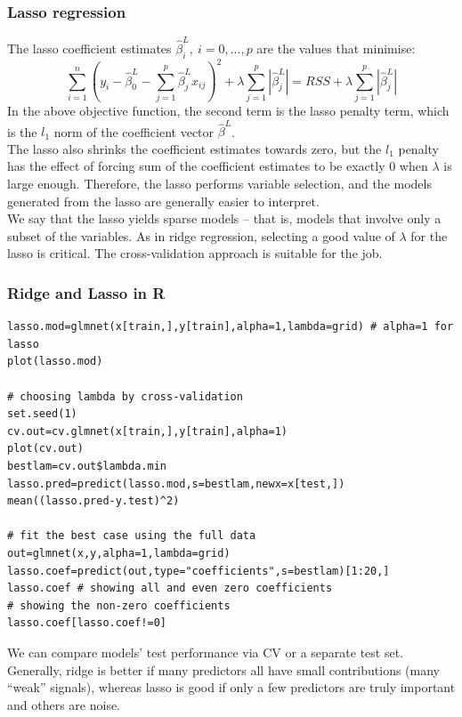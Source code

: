 \documentclass[11pt]{article}
\begin{document}
\subsubsection{Lasso regression}
\noindent The lasso coefficient estimates $\hat{\beta}_{i}^{L}, \ i=0,...,p$ are the values that minimise:
$$\sum_{i=1}^{n}(y_i - \hat{\beta}_{0}^{L} - \sum_{j=1}^{p}\hat\beta_{j}^{L}x_{ij})^2 +\lambda\sum_{j=1}^{p}|\hat\beta_j^L| = RSS + \lambda\sum_{j=1}^{p}|\hat\beta_j^L|$$
\noindent In the above objective function, the second term is the lasso penalty term, which is the $l_1$ norm of the coefficient vector $\hat{\beta}^{L}$. \\

\noindent The lasso also shrinks the coefficient estimates towards zero, but the $l_1$ penalty has the effect of forcing sum of the coefficient estimates to be exactly $0$ when $\lambda$ is large enough. Therefore, the lasso performs variable selection, and the models generated from the lasso are generally easier to interpret. \\

\noindent We say that the lasso yields sparse models -- that is, models that involve only a subset of the variables. As in ridge regression, selecting a good value of $\lambda$ for the lasso is critical. The cross-validation approach is suitable for the job.

\subsubsection{Ridge and Lasso in R}
\begin{lstlisting}
lasso.mod=glmnet(x[train,],y[train],alpha=1,lambda=grid) # alpha=1 for lasso
plot(lasso.mod)

# choosing lambda by cross-validation
set.seed(1)
cv.out=cv.glmnet(x[train,],y[train],alpha=1)
plot(cv.out)
bestlam=cv.out$lambda.min
lasso.pred=predict(lasso.mod,s=bestlam,newx=x[test,])
mean((lasso.pred-y.test)^2)

# fit the best case using the full data
out=glmnet(x,y,alpha=1,lambda=grid)
lasso.coef=predict(out,type="coefficients",s=bestlam)[1:20,]
lasso.coef # showing all and even zero coefficients
# showing the non-zero coefficients
lasso.coef[lasso.coef!=0]
\end{lstlisting}

\noindent We can compare models' test performance via CV or a separate test set. Generally, ridge is better if many predictors all have small contributions (many “weak” signals), whereas lasso is good if only a few predictors are truly important and others are noise.
\end{document}
